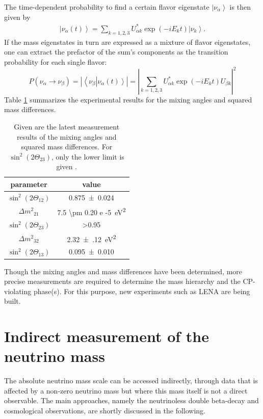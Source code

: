 	The time-dependent probability to find a certain flavor eigenstate $\left|\nu_{\alpha}\right>$ is then given by
	\begin{equation}
		\begin{split}
			\left|\nu_\alpha(t)\right> = \sum_{k = 1,2,3} U^*_{\alpha k}\exp\left(-iE_k t\right)\left|\nu_k\right>.
		\end{split}
	\end{equation}
	If the mass eigenstates in turn are expressed as a mixture of flavor eigenstates, one can extract the prefactor of the sum's components as the transition probability for each single flavor:
	\begin{equation}
		P(\nu_\alpha \rightarrow\nu_\beta) = \left| \left<\nu_\beta\right|\left.\nu_\alpha(t)\right>\right|= \left|\sum_{k=1,2,3}U^*_{\alpha k} \exp{\left(-iE_kt\right)}U_{\beta k}\right|^2
	\end{equation}
	Table \ref{tab:neutrinoParameters} summarizes the experimental results for the mixing angles and squared mass differences.
	\begin{table}
	\centering
		\caption[Neutrino Parameters]{Given are the latest measurement results of the mixing angles and squared mass differences. For $\sin^2{\left(2\Theta_{23}\right)}$, only the lower limit is given \cite{reviewOfParticlePhysics}.}
		\label{tab:neutrinoParameters}
		\begin{tabular}{|c|c|}
		\hline
			parameter & value\\
			\hline			
			$\sin^2{\left(2\Theta_{12}\right)}$& \SI{0.875\pm 0.024}{}\\
			$\Delta {m^2}_{21}$&\SI{7.5 \pm 0.20 e -5}{\square\electronvolt}\\
			$\sin^2{\left(2\Theta_{23}\right)}$& >\SI{0.95}{}\\
			$\Delta {m^2}_{32}$ & \SI{2.32(12)}{\square\electronvolt} \\
			$\sin^2{\left(2\Theta_{13}\right)}$ & \SI{0.095\pm0.010}{}\\
			\hline
		\end{tabular}
		
	\end{table}
	Though the mixing angles and mass differences have been determined, more precise measurements are required to determine the mass hierarchy and the CP-violating phase(s). For this purpose, new experiments such as LENA \cite{LENA} are being built.
	
	    \section{Indirect measurement of the neutrino mass}
    \label{ch:Introduction:sec:Massive neutrino:subsec:indirect Neutrino Mass measurement}
   	The absolute neutrino mass scale can be accessed indirectly, through data that is affected by a non-zero neutrino mass but where this mass itself is not a direct observable. The main approaches, namely the neutrinoless double beta-decay and cosmological observations, are shortly discussed in the following.\\\\
